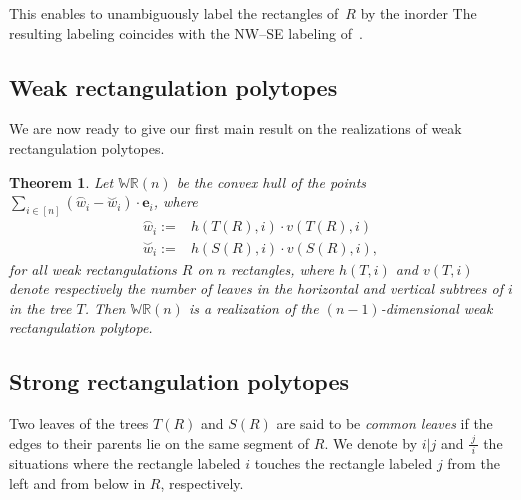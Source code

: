 \documentclass{amsart}
\newtheorem{theorem}{Theorem}%
\theoremstyle{definition}
\newcommand{\darkblue}{\color{darkblue}} %
\newcommand{\defn}[1]{\textsl{\darkblue #1}} %
\newcommand{\polytope}[1]{\mathds{#1}} %
\newcommand{\WRP}{\polytope{WR}} %
\newcommand{\loday}[1]{\overset{\frown}{#1}}
\newcommand{\antiloday}[1]{\overset{\smile}{#1}}
\begin{document}
This enables to unambiguously label the rectangles of~$R$ by the inorder 
The resulting labeling coincides with the NW--SE labeling of~\cite{AsinowskiCardinalFelsnerFusy}.

\subsection{Weak rectangulation polytopes}

We are now ready to give our first main result on the realizations of weak rectangulation polytopes.

\begin{theorem}
  Let $\WRP (n)$ be the convex hull of the points
  $\sum_{i\in [n]} (\loday{w}_i - \antiloday{w}_i)\cdot \mathbf{e}_i$,
  where
  \[
  \begin{split}
    \loday{w}_i := & h(T(R), i)\cdot v(T(R),i) \\
    \antiloday{w}_i := & h(S(R), i)\cdot v(S(R),i),
  \end{split}
  \]
  for all weak rectangulations $R$ on $n$ rectangles, where $h(T,i)$ and $v(T,i)$ denote respectively the number of leaves in the horizontal and vertical subtrees of $i$ in the tree $T$.
  Then $\WRP (n)$ is a realization of the $(n-1)$-dimensional weak rectangulation polytope.
\end{theorem}

\subsection{Strong rectangulation polytopes}

Two leaves of the trees $T(R)$ and $S(R)$ are said to be \defn{common leaves} if the edges to their parents lie on the same segment of $R$. We denote by $i|j$ and $\frac{\ j\ }i$ the situations where the rectangle labeled $i$ touches the rectangle labeled $j$ from the left and from below in $R$, respectively.
\end{document}

